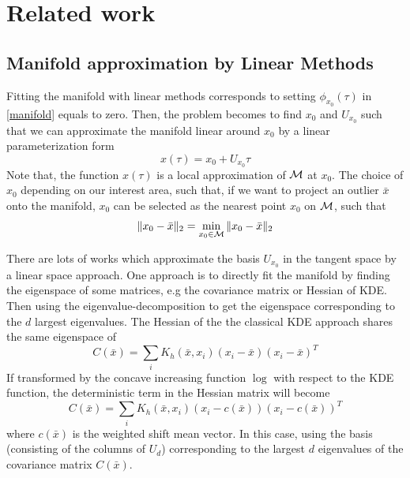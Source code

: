 \documentclass[aos,preprint]{imsart}
\theoremstyle{remark}
\begin{document}
\section{Related work}
\subsection{Manifold approximation by Linear Methods}
Fitting the manifold with linear methods corresponds to setting $\phi_{x_0}(\tau)$ in \eqref{manifold} equals to zero. Then, the problem becomes to find $x_0$ and $U_{x_0}$ such that we can approximate the manifold linear around $x_0$ by a linear parameterization form
\[
x(\tau) = x_0 + U_{x_0} \tau
\]
Note that, the function $x(\tau)$ is a local approximation of $\cal M$ at $x_0$. The choice of $x_0$ depending on our interest area, such that, if we want to project an outlier $\bar{x}$ onto the manifold, $x_0$ can be selected as the nearest point $x_0$ on $\cal M$, such that 
\[
\|x_0-\bar{x}\|_2=\min_{x_0\in \cal M} \|x_0-\bar{x}\|_2
\]

There are lots of works which approximate the basis $U_{x_0}$ in the tangent space by a linear space approach. 
One approach is to directly fit the manifold by finding the eigenspace of some matrices, e.g the covariance matrix or Hessian of KDE. Then using the eigenvalue-decomposition to get the eigenspace corresponding to the $d$ largest eigenvalues. The Hessian of the the classical KDE approach shares the same eigenspace of 
\[
C(\bar{x}) = \sum_i K_h(\bar{x},x_i) (x_i-\bar{x})(x_i-\bar{x})^T
\]
If transformed by the concave increasing function $\log$ with respect to the KDE function, the deterministic term in the Hessian matrix will become 
\[
C(\bar{x}) = \sum_i K_h(\bar{x},x_i) (x_i-c(\bar{x}))(x_i-c(\bar{x}))^T
\]
where $c(\bar{x})$ is the weighted shift mean vector. In this case, using the basis (consisting of the columns of $U_d$) corresponding to the largest $d$ eigenvalues of the covariance matrix $C(\bar{x})$. 
\end{document}
